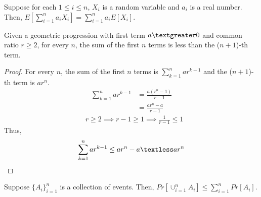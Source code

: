 \begin{lemma}\label{linearity}
Suppose for each $1 \le i \le n$, $X_i$ is a random variable and $a_i$ is a real number. Then, $E[\sum_{i=1}^na_iX_i]=\sum_{i=1}^{n}a_iE[X_i]$.
\end{lemma}
\begin{lemma}\label{gp}
Given a geometric progression with first term $a \textgreater 0$ and common ratio $r \ge 2$, for every $n$, the sum of the first $n$ terms is less than the ($n+1$)-th term.
\end{lemma}
\begin{proof}
For every $n$, the sum of the first $n$ terms is $\sum_{k=1}^{n}ar^{k-1}$ and the ($n+1$)-th term is $ar^{n}$.
\begin{align}
    \nonumber \sum_{k=1}^{n}ar^{k-1}&=\frac{a(r^{n}-1)}{r-1}\\
    \nonumber &=\frac{ar^{n}-a}{r-1}
\end{align}
\begin{align}
    \nonumber &r\ge 2 \implies r-1 \ge 1 \implies \frac{1}{r-1} \le 1
\end{align}
Thus, 
\begin{align}
    \nonumber \sum_{k=1}^{n}ar^{k-1}\le ar^{n}-a \textless ar^{n}
\end{align} 
\end{proof}
\begin{lemma}\label{union}
Suppose $\{A_i\}_{i=1}^n$ is a collection of events. Then, $Pr[\cup_{i=1}^{n}A_i]\le\sum_{i=1}^{n}Pr[A_i]$.
\end{lemma}

